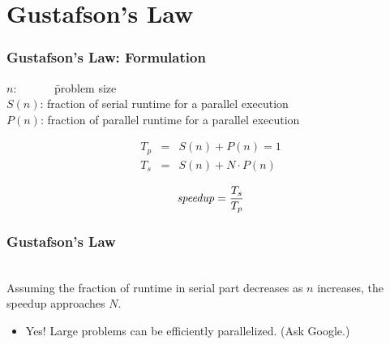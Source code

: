 \documentclass[aspectratio=43]{beamer}
\begin{document}
\section{Gustafson's Law}
\begin{frame}
  \frametitle{Gustafson's Law: Formulation}

\hspace*{2em} \begin{minipage}{.8\textwidth}
\begin{tabbing}
  $n$:~~~~~~ \= problem size\\[.1em]

  $S(n)$: \> fraction of serial runtime for a parallel execution\\[.1em]

  $P(n)$: \> fraction of parallel runtime for a parallel execution\\
\end{tabbing}
\end{minipage}

\begin{eqnarray*}
T_p &=& S(n) + P(n) = 1 \\
T_s &=& S(n) + N \cdot P(n) 
\end{eqnarray*}

\[ \mbox{\em speedup} = \frac{T_s}{T_p} \]
\end{frame}

\begin{frame}
  \frametitle{Gustafson's Law}

\hspace*{2em}\begin{minipage}{.8\textwidth}
  \\[1em]

  Assuming the fraction of runtime in serial part decreases as $n$ increases,
  the speedup approaches $N$.

  \begin{itemize}
    \item Yes! Large problems can be efficiently parallelized. (Ask Google.)
  \end {itemize}
\end{minipage}
\end{frame}
\end{document}
